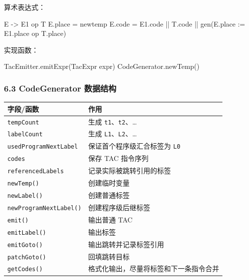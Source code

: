 \documentclass[
  a4paper,
  fontset=none,
]{ctexart}
\newenvironment{Shaded}{}{}
\newcommand{\NormalTok}[1]{#1}
\begin{document}
算术表达式：

\begin{Shaded}
\begin{Highlighting}[]
\NormalTok{E {-}\textgreater{} E1 op T}
\NormalTok{E.place = newtemp}
\NormalTok{E.code = E1.code || T.code || gen(E.place := E1.place op T.place)}
\end{Highlighting}
\end{Shaded}

实现函数：

\begin{Shaded}
\begin{Highlighting}[]
\NormalTok{TacEmitter.emitExpr(TacExpr expr)}
\NormalTok{CodeGenerator.newTemp()}
\end{Highlighting}
\end{Shaded}

\hypertarget{codegenerator-ux6570ux636eux7ed3ux6784}{%
\subsubsection{6.3 CodeGenerator
数据结构}\label{codegenerator-ux6570ux636eux7ed3ux6784}}

\begin{longtable}[]{@{}ll@{}}
\toprule\noalign{}
字段/函数 & 作用 \\
\midrule\noalign{}
\endhead
\bottomrule\noalign{}
\endlastfoot
\texttt{tempCount} & 生成 \texttt{t1}、\texttt{t2}、\ldots{} \\
\texttt{labelCount} & 生成 \texttt{L1}、\texttt{L2}、\ldots{} \\
\texttt{usedProgramNextLabel} & 保证首个程序级汇合标签为 \texttt{L0} \\
\texttt{codes} & 保存 TAC 指令序列 \\
\texttt{referencedLabels} & 记录实际被跳转引用的标签 \\
\texttt{newTemp()} & 创建临时变量 \\
\texttt{newLabel()} & 创建普通标签 \\
\texttt{newProgramNextLabel()} & 创建程序级后继标签 \\
\texttt{emit()} & 输出普通 TAC \\
\texttt{emitLabel()} & 输出标签 \\
\texttt{emitGoto()} & 输出跳转并记录标签引用 \\
\texttt{patchGoto()} & 回填跳转目标 \\
\texttt{getCodes()} & 格式化输出，尽量将标签和下一条指令合并 \\
\end{longtable}
\end{document}
